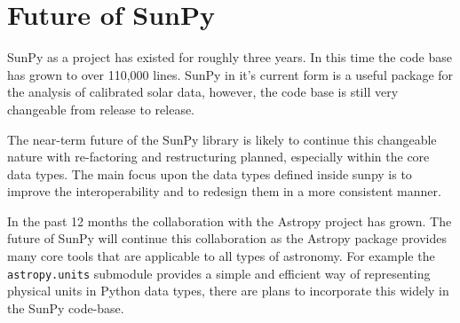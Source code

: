\section{Future of SunPy}
SunPy as a project has existed for roughly three years. In this time the code 
base has grown to over 110,000 lines. SunPy in it's current form is a useful 
package for the analysis of calibrated solar data, however, the code base is 
still very changeable from release to release.

The near-term future of the SunPy library is likely to continue this changeable 
nature with re-factoring and restructuring planned, especially within the 
core data types. The main focus upon the data types defined inside sunpy is to 
improve the interoperability and to redesign them in a more consistent manner.

In the past 12 months the collaboration with the Astropy project 
\cite{theastropycollaboration2013} has grown. The future of SunPy 
will continue this collaboration as the Astropy package provides many core 
tools that are applicable to all types of astronomy. For example the 
\texttt{astropy.units} submodule provides a simple and efficient way of 
representing physical units in Python data types, there are plans to 
incorporate this widely in the SunPy code-base.

